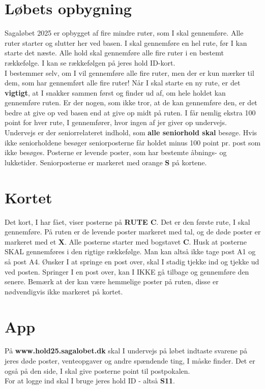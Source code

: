 \section{Løbets opbygning}
Sagaløbet 2025 er opbygget af fire mindre ruter, som I skal gennemføre. Alle ruter starter og slutter her ved basen. I skal gennemføre en hel rute, før I kan starte det næste. Alle hold skal gennemføre alle fire ruter i en bestemt rækkefølge. I kan se rækkefølgen på jeres hold ID-kort.\\\newline
I bestemmer selv, om I vil gennemføre alle fire ruter, men der er kun mærker til dem, som har gennemført alle fire ruter! Når I skal starte en ny rute, er det \textbf{vigtigt}, at I snakker sammen først og finder ud af, om hele holdet kan gennemføre ruten. Er der nogen, som ikke tror, at de kan gennemføre den, er det bedre at give op ved basen end at give op midt på ruten. I får nemlig ekstra 100 point for hver rute, I gennemfører, hvor ingen af jer giver op undervejs.\\
\newline
Undervejs er der seniorrelateret indhold, som \textbf{alle seniorhold skal} besøge. Hvis ikke seniorholdene besøger seniorposterne får holdet minus 100 point pr. post som ikke besøges. Posterne er levende poster, som har bestemte åbnings- og lukketider. Seniorposterne er markeret med orange \textbf{S} på kortene.\\
\newline
\section{Kortet}
Det kort, I har fået, viser posterne på \textbf{RUTE C}. Det er den første rute, I skal gennemføre. På ruten er de levende poster markeret med tal, og de døde poster er markeret med et \textbf{X}. Alle posterne starter med bogstavet \textbf{C}. Husk at posterne SKAL gennemføres i den rigtige rækkefølge. Man kan altså ikke tage post A1 og så post A4. Ønsker I at springe en post over, skal I stadig tjekke ind og tjekke ud ved posten. Springer I en post over, kan I IKKE gå tilbage og gennemføre den senere. Bemærk at der kan være hemmelige poster på ruten, disse er nødvendigvis ikke markeret på kortet.
\section{App}
På \textbf{www.hold25.sagalobet.dk} skal I undervejs på løbet indtaste svarene på jeres døde poster, venteopgaver og andre spændende ting, I måske finder. Det er også på den side, I skal give posterne point til postpokalen.\\
For at logge ind skal I bruge jeres hold ID - altså \textbf{S11}.
\newpage
